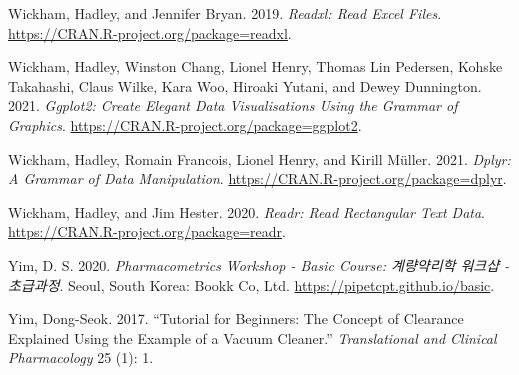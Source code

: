 \documentclass[
  11pt,
  krantz2, a4paper, twoside]{krantz}
\newlength{\cslhangindent}
\newlength{\cslentryspacingunit} %
\newenvironment{CSLReferences}[2] %
 {%
  \setlength{\parindent}{0pt}
  \ifodd #1
  \let\oldpar\par
  \def\par{\hangindent=\cslhangindent\oldpar}
  \fi
  \setlength{\parskip}{#2\cslentryspacingunit}
 }%
 {}
\theoremstyle{definition}
\theoremstyle{definition}
\theoremstyle{definition}
\theoremstyle{definition}
\theoremstyle{remark}
\begin{document}
\begin{CSLReferences}{1}{0}
\leavevmode{}%
Wickham, Hadley, and Jennifer Bryan. 2019. \emph{Readxl: Read Excel Files}. \url{https://CRAN.R-project.org/package=readxl}.

\leavevmode{}%
Wickham, Hadley, Winston Chang, Lionel Henry, Thomas Lin Pedersen, Kohske Takahashi, Claus Wilke, Kara Woo, Hiroaki Yutani, and Dewey Dunnington. 2021. \emph{Ggplot2: Create Elegant Data Visualisations Using the Grammar of Graphics}. \url{https://CRAN.R-project.org/package=ggplot2}.

\leavevmode{}%
Wickham, Hadley, Romain Francois, Lionel Henry, and Kirill Müller. 2021. \emph{Dplyr: A Grammar of Data Manipulation}. \url{https://CRAN.R-project.org/package=dplyr}.

\leavevmode{}%
Wickham, Hadley, and Jim Hester. 2020. \emph{Readr: Read Rectangular Text Data}. \url{https://CRAN.R-project.org/package=readr}.

\leavevmode{}%
Yim, D. S. 2020. \emph{Pharmacometrics Workshop - Basic Course: 계량약리학 워크샵 - 초급과정}. Seoul, South Korea: Bookk Co, Ltd. \url{https://pipetcpt.github.io/basic}.

\leavevmode{}%
Yim, Dong-Seok. 2017. {``Tutorial for Beginners: The Concept of Clearance Explained Using the Example of a Vacuum Cleaner.''} \emph{Translational and Clinical Pharmacology} 25 (1): 1.

\end{CSLReferences}

\printindex
\end{document}
